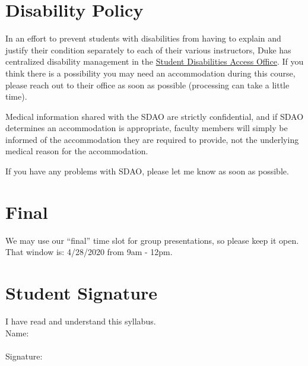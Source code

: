 \documentclass[12pt]{article}
\begin{document}
\section{Disability Policy}

In an effort to prevent students with disabilities from having to explain and justify their condition separately to each of their various instructors, Duke has centralized disability management in the \href{https://access.duke.edu/students}{Student Disabilities Access Office}. If you think there is a possibility you may need an accommodation during this course, please reach out to their office as soon as possible (processing can take a little time).

Medical information shared with the SDAO are strictly confidential, and if SDAO determines an accommodation is appropriate, faculty members will simply be informed of the accommodation they are required to provide, not the underlying medical reason for the accommodation.

If you have any problems with SDAO, please let me know as soon as possible.

\section{Final}

We may use our ``final'' time slot for group presentations, so please keep it open. That window is: 4/28/2020 from 9am - 12pm.

\section{Student Signature}

I have read and understand this syllabus. \\


Name: \\
\vspace{2cm}\\
Signature:
\end{document}
